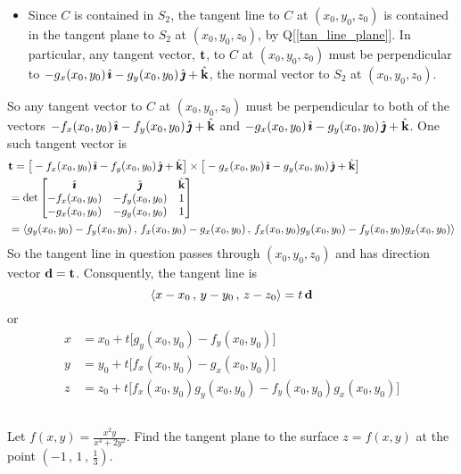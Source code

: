 \begin{solution}
\begin{itemize}
\item
Since $C$ is contained in $S_2$, the tangent line to $C$ at $(x_0,y_0,z_0)$
is contained in the tangent plane to $S_2$ at $(x_0,y_0,z_0)$, by 
Q[\ref{tan_line_plane}]. In particular, any tangent vector, $\mathbf{t}$, to 
$C$ at $(x_0,y_0,z_0)$ must be perpendicular to $-g_x(x_0,y_0)\,\hat{\pmb{\imath}}
-g_y(x_0,y_0)\,\hat{\pmb{\jmath}}+\hat{\mathbf{k}}$,
the normal vector to $S_2$ at $(x_0,y_0,z_0)$.
\end{itemize}
So any tangent vector to $C$ at $(x_0,y_0,z_0)$ must be perpendicular to
both of the vectors $-f_x(x_0,y_0)\,\hat{\pmb{\imath}}-f_y(x_0,y_0)\,\hat{\pmb{\jmath}}+\hat{\mathbf{k}}$ and
$-g_x(x_0,y_0)\,\hat{\pmb{\imath}} -g_y(x_0,y_0)\,\hat{\pmb{\jmath}}+\hat{\mathbf{k}}$.
One such tangent vector is
\begin{align*}
&\mathbf{t} = \big[-f_x(x_0,y_0)\,\hat{\pmb{\imath}} - f_y(x_0,y_0)\,\hat{\pmb{\jmath}}+\hat{\mathbf{k}}\big]\times 
       \big[-g_x(x_0,y_0)\,\hat{\pmb{\imath}} - g_y(x_0,y_0)\,\hat{\pmb{\jmath}}+\hat{\mathbf{k}}\big] \\
    &=\det\left[\begin{matrix}
                     \hat{\pmb{\imath}} &        \hat{\pmb{\jmath}} &   \hat{\mathbf{k}} \\
           -f_x(x_0,y_0) & -f_y(x_0,y_0) & 1 \\
           -g_x(x_0,y_0) & -g_y(x_0,y_0) & 1
                \end{matrix}\right] \\
    &=\left< g_y(x_0,y_0)-f_y(x_0,y_0)\,,\,
           f_x(x_0,y_0)-g_x(x_0,y_0)\,,\,
           f_x(x_0,y_0)g_y(x_0,y_0)-f_y(x_0,y_0)g_x(x_0,y_0)\right>
\end{align*}
So the tangent line in question passes through $(x_0,y_0,z_0)$ and has 
direction vector $\mathbf{d}=\mathbf{t}$. Consquently, the tangent line is 
\begin{equation*}
\left< x-x_0\,,\,y-y_0\,,\,z-z_0\right> = t\,\mathbf{d}
\end{equation*}
or
\begin{align*}
x&=x_0+t\big[g_y(x_0,y_0)-f_y(x_0,y_0)\big] \\
y&=y_0+t\big[f_x(x_0,y_0)-g_x(x_0,y_0)\big] \\
z&=z_0+ t\big[f_x(x_0,y_0)g_y(x_0,y_0)-f_y(x_0,y_0)g_x(x_0,y_0)\big]
\end{align*}


\end{solution}




\subsection*{\Procedural}

\begin{question}[M200 2009A] %
Let $\displaystyle f(x,y)=\frac{x^2y}{x^4+2y^2}$.
Find the tangent plane to the surface $z = f(x,y)$ at the point
$\left( -1\,,\,1\,,\,\frac{1}{3}\right)$.
\end{question}

